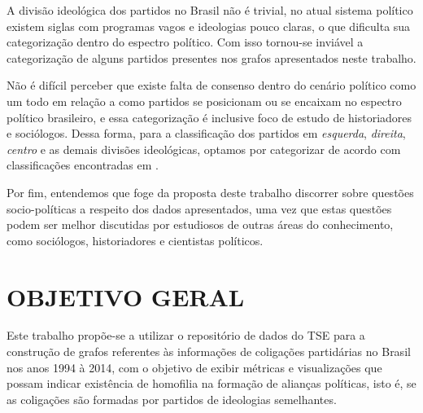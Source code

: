 A divisão ideológica dos partidos no Brasil não é trivial, no atual sistema político existem siglas com programas vagos e ideologias pouco claras, o que dificulta sua categorização dentro do espectro político. Com isso tornou-se inviável a categorização de alguns partidos presentes nos grafos apresentados neste trabalho.

Não é difícil perceber que existe falta de consenso dentro do cenário político como um todo em relação a como partidos se posicionam ou se encaixam no espectro político brasileiro, e essa categorização é inclusive foco de estudo de historiadores e sociólogos. Dessa forma, para a classificação dos partidos em \emph{esquerda}, \emph{direita}, \emph{centro} e as demais divisões ideológicas, optamos por categorizar de acordo com classificações encontradas em .

Por fim, entendemos que foge da proposta deste trabalho discorrer sobre questões socio-políticas a respeito dos dados apresentados, uma vez que estas questões podem ser melhor discutidas por estudiosos de outras áreas do conhecimento, como sociólogos, historiadores e cientistas políticos.





\section{\texorpdfstring{\MakeUppercase{Objetivo Geral}}{}}
\label{proposta__objetivo-geral}

Este trabalho propõe-se a utilizar o repositório de dados do \gls{TSE} para a construção de grafos referentes às informações de coligações partidárias no Brasil nos anos 1994 à 2014, com o objetivo de exibir métricas e visualizações que possam indicar existência de homofilia na formação de alianças políticas, isto é, se as coligações são formadas por partidos de ideologias semelhantes.

